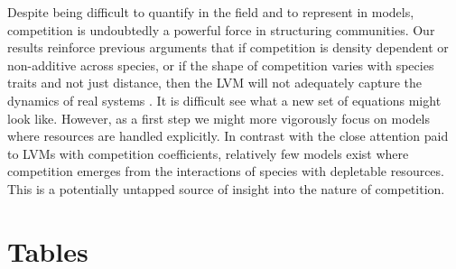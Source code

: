 \documentclass[a4paper,11pt]{article}
\begin{document}
Despite being difficult to quantify in the field and to represent in models, competition is undoubtedly a powerful force in structuring communities. Our results reinforce previous arguments that if competition is density dependent or non-additive across species, or if the shape of competition varies with species traits and not just distance, then the LVM will not adequately capture the dynamics of real systems \citep{Andrewartha-1953, Neill-1974, Abrams-1975, Wangersky-1978,Abrams-1980, Tilman-1987}. It is difficult see what a new set of equations might look like. However, as a first step we might more vigorously focus on models where resources are handled explicitly. In contrast with the close attention paid to LVMs with competition coefficients, relatively few models exist where competition emerges from the interactions of species with depletable resources. This is a potentially untapped source of insight into the nature of competition.

\clearpage

\section{Tables}
\end{document}
